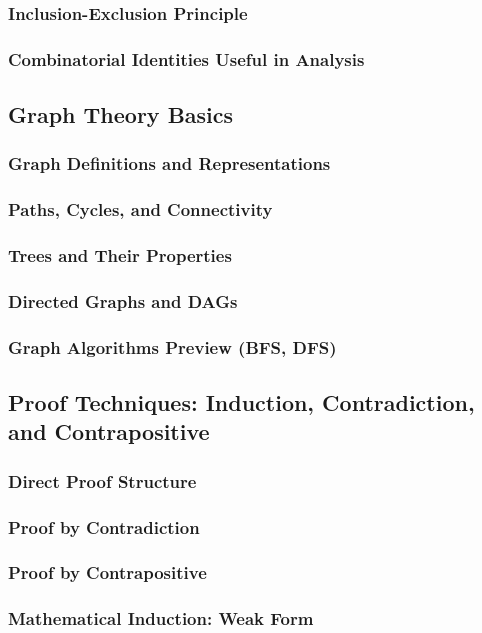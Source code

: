 \subsubsection{Inclusion-Exclusion Principle}
\subsubsection{Combinatorial Identities Useful in Analysis}

\subsection{Graph Theory Basics}
\subsubsection{Graph Definitions and Representations}
\subsubsection{Paths, Cycles, and Connectivity}
\subsubsection{Trees and Their Properties}
\subsubsection{Directed Graphs and DAGs}
\subsubsection{Graph Algorithms Preview (BFS, DFS)}

\subsection{Proof Techniques: Induction, Contradiction, and Contrapositive}
\subsubsection{Direct Proof Structure}
\subsubsection{Proof by Contradiction}
\subsubsection{Proof by Contrapositive}
\subsubsection{Mathematical Induction: Weak Form}
